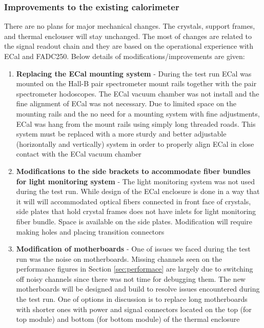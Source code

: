 \subsubsection{Improvements to the existing calorimeter}

There are no plans for major mechanical changes. The crystals, support frames, and thermal enclouser will stay unchanged. The most of changes are related to the signal readout chain and they are based on the operational experience with ECal and FADC250. Below details of modifications/improvements are given: 

\begin{enumerate}
\item {\bf Replacing the ECal mounting system} - 
During the test run ECal was mounted on the Hall-B pair spectrometer mount rails together with the pair spectrometer hodoscopes. The ECal vacuum chamber was not install and the fine alignment of ECal was not necessary. Due to limited space on the mounting rails and the no need for a mounting system with fine adjustments, ECal was hang from the mount rails using simply long threaded roads. This system must be replaced with a more sturdy and better adjustable (horizontally and vertically) system in order to properly align ECal in close contact with the ECal vacuum chamber

\item {\bf Modifications to the side brackets to accommodate fiber bundles for light monitoring system} -
The light monitoring system was not used during the test run. While design of the ECal enclosure is done in a way that it will will accommodated optical fibers connected in front face of crystals, side plates that hold crystal frames does not have inlets for light monitoring fiber bundle. Space is available on the side plates. Modification will require making holes and placing transition connectors  
    
\item {\bf Modification of motherboards} - One of issues we faced during the test run was the noise on motherboards. Missing channels seen on the performance figures in Section \ref{sec:performace} are largely due to switching off noisy channels since there was not time for debugging them. The new motherboards will be designed and build to resolve issues encountered during the test run. One of options in discussion is to replace long motherboards with shorter ones with power and signal connectors located on the top (for top module) and bottom (for bottom module) of the thermal enclosure


\end{enumerate}
